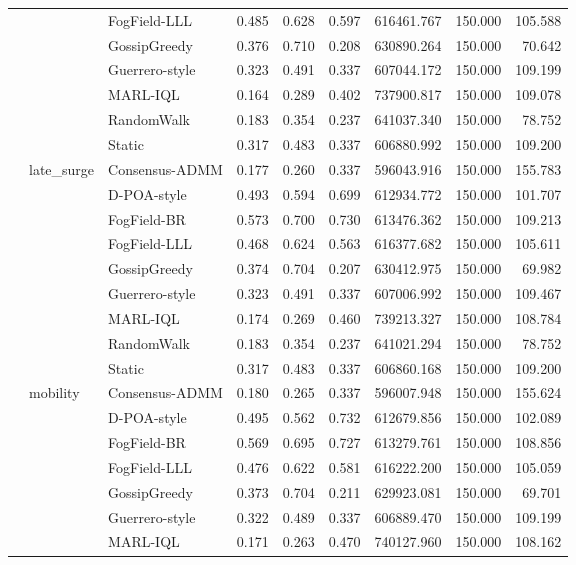 \begin{table}
\begin{tabular}{lllrrrrrr}
 &  & FogField-LLL & 0.485 & 0.628 & 0.597 & 616461.767 & 150.000 & 105.588 \\
 &  & GossipGreedy & 0.376 & 0.710 & 0.208 & 630890.264 & 150.000 & 70.642 \\
 &  & Guerrero-style & 0.323 & 0.491 & 0.337 & 607044.172 & 150.000 & 109.199 \\
 &  & MARL-IQL & 0.164 & 0.289 & 0.402 & 737900.817 & 150.000 & 109.078 \\
 &  & RandomWalk & 0.183 & 0.354 & 0.237 & 641037.340 & 150.000 & 78.752 \\
 &  & Static & 0.317 & 0.483 & 0.337 & 606880.992 & 150.000 & 109.200 \\
\cline{2-9}
 & \multirow[t]{9}{*}{late\_surge} & Consensus-ADMM & 0.177 & 0.260 & 0.337 & 596043.916 & 150.000 & 155.783 \\
 &  & D-POA-style & 0.493 & 0.594 & 0.699 & 612934.772 & 150.000 & 101.707 \\
 &  & FogField-BR & 0.573 & 0.700 & 0.730 & 613476.362 & 150.000 & 109.213 \\
 &  & FogField-LLL & 0.468 & 0.624 & 0.563 & 616377.682 & 150.000 & 105.611 \\
 &  & GossipGreedy & 0.374 & 0.704 & 0.207 & 630412.975 & 150.000 & 69.982 \\
 &  & Guerrero-style & 0.323 & 0.491 & 0.337 & 607006.992 & 150.000 & 109.467 \\
 &  & MARL-IQL & 0.174 & 0.269 & 0.460 & 739213.327 & 150.000 & 108.784 \\
 &  & RandomWalk & 0.183 & 0.354 & 0.237 & 641021.294 & 150.000 & 78.752 \\
 &  & Static & 0.317 & 0.483 & 0.337 & 606860.168 & 150.000 & 109.200 \\
\cline{2-9}
 & \multirow[t]{9}{*}{mobility} & Consensus-ADMM & 0.180 & 0.265 & 0.337 & 596007.948 & 150.000 & 155.624 \\
 &  & D-POA-style & 0.495 & 0.562 & 0.732 & 612679.856 & 150.000 & 102.089 \\
 &  & FogField-BR & 0.569 & 0.695 & 0.727 & 613279.761 & 150.000 & 108.856 \\
 &  & FogField-LLL & 0.476 & 0.622 & 0.581 & 616222.200 & 150.000 & 105.059 \\
 &  & GossipGreedy & 0.373 & 0.704 & 0.211 & 629923.081 & 150.000 & 69.701 \\
 &  & Guerrero-style & 0.322 & 0.489 & 0.337 & 606889.470 & 150.000 & 109.199 \\
 &  & MARL-IQL & 0.171 & 0.263 & 0.470 & 740127.960 & 150.000 & 108.162 \\

\end{tabular}
\end{table}

